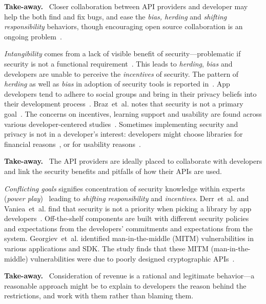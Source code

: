 \documentclass[conference]{IEEEtran}
\newenvironment{finding}{\begin{framed}\noindent\textbf{Take-away.}~}{\end{framed}}
\newcommand{\etal}[0]{et~al{.}}
\begin{document}
\begin{finding}
\noindent  
Closer collaboration between API providers and developer may help the both find and fix bugs, and ease the \emph{bias, herding} and \emph{shifting responsibility} behaviors, though encouraging open source collaboration is an ongoing problem~\cite{german2003gnome}.
\end{finding}

\emph{Intangibility} comes from a lack of visible benefit of security---problematic if security is not a functional requirement~\cite{acar2016}. This leads to \emph{herding}, \emph{bias} and developers are unable to perceive the \emph{incentives} of security. The pattern of \emph{herding} as well as \emph{bias} in adoption of security tools is reported in~\cite{witschey2015}. App developers tend to adhere to social groups and bring in their privacy beliefs into their development process~\cite{senarath2018,senarathundp2018}.  Braz~et~al{.} notes that security is not a primary goal~\cite{braz2021}. The concerns on incentives, learning support and usability are found across various developer-centered studies~\cite{tahaei2019,oliveira2014}. Sometimes implementing security and privacy is not in a developer's interest: developers might choose libraries for financial reasons~\cite{jain2014}, or for usability reasons~\cite{assal2018,thomas2018,hilton2017}. 
\begin{finding}
 \noindent  
The API providers are ideally placed to collaborate with developers and link the security benefits and pitfalls of how their APIs are used.
\end{finding}

\emph{Conflicting goals} signifies concentration of security knowledge within experts (\emph{power play})~\cite{weir2020,thomas2018,poller2017} leading to \emph{shifting responsibility} and \emph{incentives}. Derr~\etal{} and Vaniea~\etal{} find that security is not a priority when picking a library by app developers~\cite{erikacar2017,vaniea2016}. Off-the-shelf components are built with different security policies and expectations from the developers' commitments and expectations from the system. Georgiev~\etal{} identified man-in-the-middle (MITM) vulnerabilities in various applications and SDK. The study finds that these MITM (man-in-the-middle) vulnerabilities were due to poorly designed cryptographic APIs~\cite{georgiev2012most}. 

\begin{finding}
\noindent  
Consideration of revenue is a rational and legitimate behavior---a reasonable approach might be to explain to developers the reason behind the restrictions, and work with them rather than blaming them. 
\end{finding}
\end{document}
